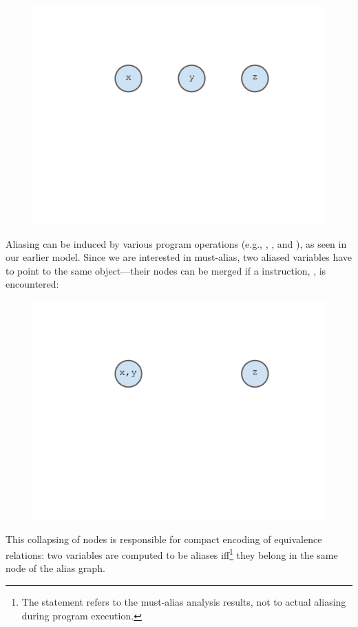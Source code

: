 \begin{figure}[ht]
\centering
\includegraphics[trim={35mm 115mm 35mm 51mm},clip,width=0.8\linewidth]{assets/must-data/alias-graph0.pdf}
\end{figure}

Aliasing can be induced by various program operations (e.g., , , and ), as seen in our earlier model. Since we are interested in must-alias, two aliased variables have to point to the same object---their nodes can be merged if a  instruction, , is encountered:

\begin{figure}[ht]
\centering
\includegraphics[trim={35mm 115mm 35mm 51mm},clip,width=0.8\linewidth]{assets/must-data/alias-graph1.pdf}
\end{figure}

This collapsing of nodes is responsible for compact encoding of equivalence relations: two variables are computed to be aliases iff\footnote{The statement refers to the must-alias analysis results, not to actual aliasing during program execution.} they belong in the same node of the alias graph.

